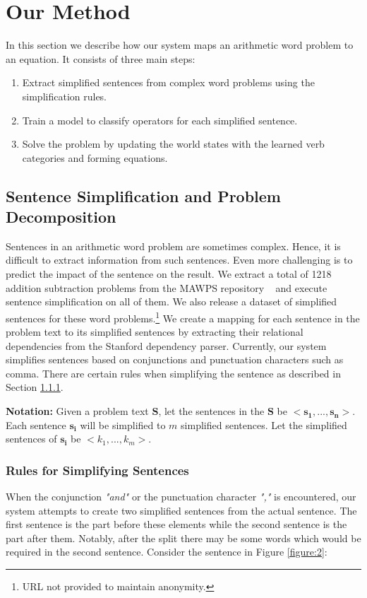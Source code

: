 \documentclass[11pt]{article}
\begin{document}
\section{Our Method}
In this section we describe how our system maps an arithmetic word problem to an equation. It consists of three main steps:
\begin{enumerate}
\item Extract simplified sentences from complex word problems using the simplification rules. 
\item Train a model to classify operators for each simplified sentence.
\item Solve the problem by updating the world states with the learned verb categories and forming equations.
\end{enumerate}

\subsection{Sentence Simplification and Problem Decomposition}
Sentences in an arithmetic word problem are sometimes complex. Hence, it is difficult to extract information from such sentences. Even more challenging is to predict the impact of the sentence on the result. We extract a total of 1218 addition subtraction problems from the MAWPS repository ~\cite{MAWPS} and execute sentence simplification on all of them. We also release a dataset of simplified sentences for these word problems.\footnote{URL not provided to maintain anonymity.} We create a mapping for each sentence in the problem text to its simplified sentences by extracting their relational dependencies from the Stanford dependency parser. Currently, our system simplifies sentences based on conjunctions and punctuation characters such as comma. There are certain rules when simplifying the sentence as described in Section \ref{sec:SimplificationRules}.

\textbf{Notation:} Given a problem text $\mathbf{S}$, let the sentences in the $\mathbf{S}$ be $\mathbf{<s_{1},..., s_{n}>}$. Each sentence $\mathbf{s_{i}}$ will be simplified to \begin{math}m\end{math} simplified sentences. Let the simplified sentences of $\mathbf{s_{i}}$ be $\mathit{<k_{1},..., k_{m}>}$.

\subsubsection{Rules for Simplifying Sentences}\label{sec:SimplificationRules}
When the conjunction \textit{"and"} or  the punctuation character \textit{","} is encountered, our system attempts to create two simplified sentences from the actual sentence. The first sentence is the part before these elements while the second sentence is the part after them. Notably, after the split there may be some words which would be required in the second sentence. Consider the sentence in Figure \ref{figure:2}: 
\end{document}
